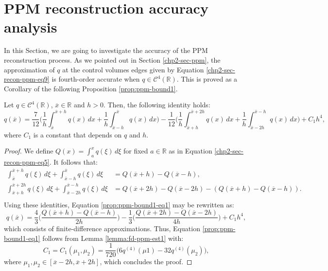 \section{PPM reconstruction accuracy analysis}
\label{chp2-sec-numerical-analysis-ppm}
In this Section, we are going to investigate the accuracy of the PPM reconstruction process.
As we pointed out in Section \ref{chp2-sec-ppm}, the approximation of $q$ at the control volumes edges
given by Equation \eqref{chp2-sec-recon-ppm-eq9} is fourth-order accurate when $q \in \mathcal{C}^4(\mathbb{R})$. 
This is proved as a Corollary of the following Proposition \ref{prop:ppm-bound1}.
\begin{prop}
	\label{prop:ppm-bound1}
	Let $q \in \mathcal{C}^{4}(\mathbb{R})$, $\overline{x} \in \mathbb{R} $ and $h>0$.
	Then, the following identity holds:
	\begin{equation}
		\label{prop:ppm-bound1-eq1}
		q(\overline{x} ) = \frac{7}{12}\bigg( \frac{1}{h} \int_{\overline{x} }^{\overline{x}+h} q(x) \,dx 
		+ \frac{1}{h} \int_{\overline{x} -h}^{\overline{x} } q(x) \,dx  \bigg)
		- \frac{1}{12}\bigg( \frac{1}{h} \int_{\overline{x} +h}^{\overline{x}+2h} q(x) \,dx 
		+ \frac{1}{h} \int_{\overline{x} -2h}^{\overline{x} -h} q(x) \,dx  \bigg) + C_1h^4,
	\end{equation}
	where $C_1$ is a constant that depends on $q$ and $h$.
\end{prop}
\begin{proof}
	We define $Q(x) = \int_{a}^{x} q(\xi) \,d\xi$ for fixed $a \in \mathbb{R}$ as in 
	Equation \eqref{chp2-sec-recon-ppm-eq5}. It follows that:
	\begin{align*}
		\int_{\overline{x}}^{\overline{x}+h} q(\xi) \,d\xi + \int_{\overline{x}-h}^{\overline{x}} q(\xi) \,d\xi &=
		Q(\overline{x}+h) - Q(\overline{x}-h), \\
		\int_{\overline{x}+h}^{\overline{x}+2h} q(\xi) \,d\xi + \int_{\overline{x}-2h}^{\overline{x}-h} q(\xi) \,d\xi &=
		Q(\overline{x}+2h) - Q(\overline{x}-2h) - (Q(\overline{x}+h) - Q(\overline{x}-h)). \\
	\end{align*}
	Using these identities, Equation \eqref{prop:ppm-bound1-eq1} may be rewritten as:
	\begin{equation}
		\label{prop:ppm-bound1-eq2}
		q(\overline{x}) = \frac{4}{3} \bigg(\frac{Q(\overline{x}+h) - Q(\overline{x}-h)}{2h}\bigg)
		- \frac{1}{3} \bigg(\frac{Q(\overline{x}+2h) - Q(\overline{x}-2h)}{4h}\bigg) + C_1h^4,
	\end{equation}
	which consists of finite-difference approximations. 
	Thus, Equation \eqref{prop:ppm-bound1-eq1} follows from Lemma \ref{lemma:fd-ppm-est1}
	with:
	\begin{equation}
		\label{prop:ppm-bound1-eq3}
		C_1 = C_1(\mu_1,\mu_2) = \frac{1}{720}\bigg(6q^{(4)}(\mu{1}) -32q^{(4)}(\mu_{2})\bigg), 
	\end{equation}
	where $\mu_{1}, \mu_{2} \in [\overline{x}-2h,\overline{x}+2h]$,
	which concludes the proof.
\end{proof}
